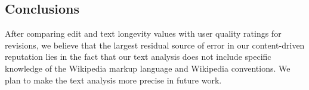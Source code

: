 \subsection{Conclusions}

After comparing edit and text longevity values with user quality
ratings for revisions, we believe that the largest residual source of
error in our content-driven reputation lies in the fact that our text
analysis does not include specific knowledge of the Wikipedia markup
language and Wikipedia conventions. 
We plan to make the text analysis more precise in future work. 

